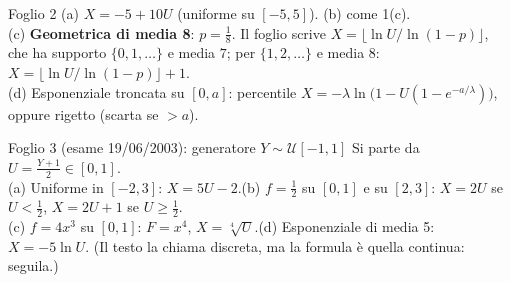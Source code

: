 \begin{esempio}{Foglio 2}
(a) $X=-5+10U$ (uniforme su $[-5,5]$). \quad (b) come 1(c).\\
(c) \textbf{Geometrica di media 8}: $p=\tfrac18$. Il foglio scrive $X=\lfloor\ln U/\ln(1-p)\rfloor$, che ha supporto $\{0,1,\dots\}$ e media $7$; per $\{1,2,\dots\}$ e media $8$: $X=\lfloor\ln U/\ln(1-p)\rfloor+1$.\\
(d) Esponenziale troncata su $[0,a]$: percentile $X=-\lambda\ln\big(1-U(1-e^{-a/\lambda})\big)$, oppure rigetto (scarta se $>a$).
\end{esempio}

\begin{esempio}{Foglio 3 (esame 19/06/2003): generatore $Y\sim\mathcal U[-1,1]$}
Si parte da $U=\tfrac{Y+1}2\in[0,1]$.\\
(a) Uniforme in $[-2,3]$: $X=5U-2$.\quad (b) $f=\tfrac12$ su $[0,1]$ e su $[2,3]$: $X=2U$ se $U<\tfrac12$, $X=2U+1$ se $U\ge\tfrac12$.\\
(c) $f=4x^3$ su $[0,1]$: $F=x^4$, $X=\sqrt[4]U$.\quad (d) Esponenziale di media 5: $X=-5\ln U$. (Il testo la chiama \guillemotleft{}discreta\guillemotright{}, ma la formula è quella continua: seguila.)
\end{esempio}

